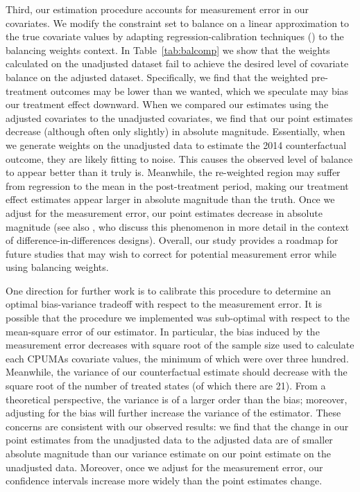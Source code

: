 Third, our estimation procedure accounts for measurement error in our covariates. We modify the constraint set to balance on a linear approximation to the true covariate values by adapting regression-calibration techniques (\cite{gleser1992importance}) to the balancing weights context. In Table~\ref{tab:balcomp} we show that the weights calculated on the unadjusted dataset fail to achieve the desired level of covariate balance on the adjusted dataset. Specifically, we find that the weighted pre-treatment outcomes may be lower than we wanted, which we speculate may bias our treatment effect downward. When we compared our estimates using the adjusted covariates to the unadjusted covariates, we find that our point estimates decrease (although often only slightly) in absolute magnitude. Essentially, when we generate weights on the unadjusted data to estimate the 2014 counterfactual outcome, they are likely fitting to noise. This causes the observed level of balance to appear better than it truly is. Meanwhile, the re-weighted region may suffer from regression to the mean in the post-treatment period, making our treatment effect estimates appear larger in absolute magnitude than the truth. Once we adjust for the measurement error, our point estimates decrease in absolute magnitude (see also \cite{daw2018matching}, who discuss this phenomenon in more detail in the context of difference-in-differences designs). Overall, our study provides a roadmap for future studies that may wish to correct for potential measurement error while using balancing weights. 

One direction for further work is to calibrate this procedure to determine an optimal bias-variance tradeoff with respect to the measurement error. It is possible that the procedure we implemented was sub-optimal with respect to the mean-square error of our estimator. In particular, the bias induced by the measurement error decreases with square root of the sample size used to calculate each CPUMAs covariate values, the minimum of which were over three hundred. Meanwhile, the variance of our counterfactual estimate should decrease with the square root of the number of treated states (of which there are 21). From a theoretical perspective, the variance is of a larger order than the bias; moreover, adjusting for the bias will further increase the variance of the estimator. These concerns are consistent with our observed results: we find that the change in our point estimates from the unadjusted data to the adjusted data are of smaller absolute magnitude than our variance estimate on our point estimate on the unadjusted data. Moreover, once we adjust for the measurement error, our confidence intervals increase more widely than the point estimates change.

